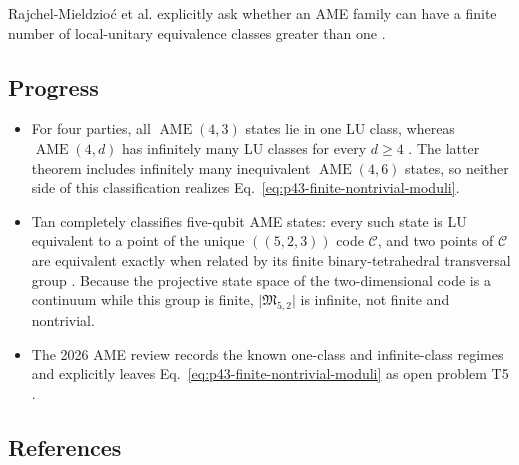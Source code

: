 Rajchel-Mieldzio\'c et al. explicitly ask whether an AME family can have a
finite number of local-unitary equivalence classes greater than one
.

\subsection*{Progress}

\begin{itemize}
  \item For four parties, all $\operatorname{AME}(4,3)$ states lie in one LU
  class, whereas $\operatorname{AME}(4,d)$ has infinitely many LU classes for
  every $d\geq 4$ .  The latter theorem
  includes infinitely many inequivalent $\operatorname{AME}(4,6)$ states, so
  neither side of this classification realizes
  Eq.~\eqref{eq:p43-finite-nontrivial-moduli}.

  \item Tan completely classifies five-qubit AME states: every such state is
  LU equivalent to a point of the unique $((5,2,3))$ code $\mathcal C$, and
  two points of $\mathcal C$ are equivalent exactly when related by its
  finite binary-tetrahedral transversal group
  .  Because the projective state space of the
  two-dimensional code is a continuum while this group is finite,
  $\lvert\mathfrak{M}_{5,2}\rvert$ is infinite, not finite and nontrivial.

  \item The 2026 AME review records the known one-class and infinite-class
  regimes and explicitly leaves Eq.~\eqref{eq:p43-finite-nontrivial-moduli}
  as open problem T5 .
\end{itemize}

\subsection*{References}

